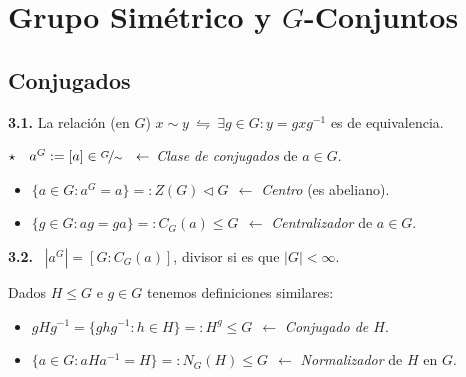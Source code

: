 \section{Grupo Simétrico y $G$-Conjuntos}

\subsection*{Conjugados}

\hypertarget{lemma31}{}
\begin{lemma}
    \textbf{3.1.} La relación (en \(G\)) \(x \sim y \ \leftrightharpoons \ \exists g \in G :  y = gxg^{-1}\) es de equivalencia. %
\end{lemma}

\begin{definition}
    \hspace{0.08cm}\(\star \ \ \  a^G := [a] \in \nicefrac{G}{\sim} \ \  \leftarrow\)  \emph{Clase de conjugados} de \(a \in G\). 
    \vspace{-0.35cm}
    \begin{itemize}[label = \(\star\), left = 1cm]
        \item \(\{a \in G : a^G = a\} =: Z(G)\lhd G\ \ \leftarrow\)  \emph{Centro} (es abeliano).
        \item \(\{g \in G : ag = ga\} = : C_G(a) \leq G\ \ \leftarrow\) \emph{Centralizador} de \(a \in G\).
    \end{itemize}
\end{definition}

\begin{theorem}
    \textbf{3.2.} \  \(|a^G| = [G : C_G(a)]\), divisor si es que \(|G| < \infty\).  
\end{theorem}


\begin{definition}
    Dados \(H \leq G\) e \(g \in G\) tenemos definiciones similares: 
    \vspace{-0.2cm}
    \begin{itemize}[label = \(\star\)]
        \item \(gHg^{-1} = \{ghg^{-1} : h \in H\} =:H^g \leq G \ \  \leftarrow\)  \emph{Conjugado de \(H\)}. 
        \item \(\{a \in G : aHa^{-1} = H\} = : N_G(H) \leq G\ \ \leftarrow\) \emph{Normalizador} de \(H\) en \( G\).
    \end{itemize}
\end{definition}

